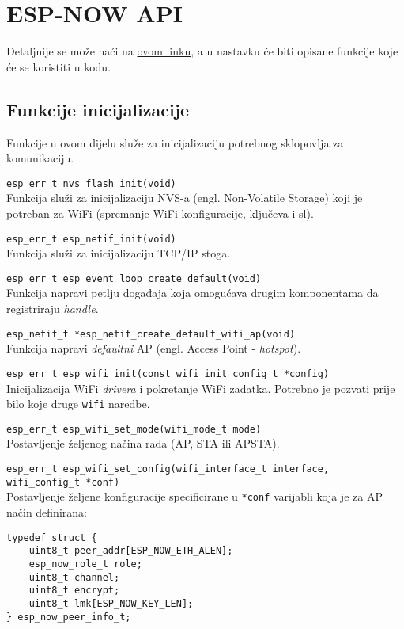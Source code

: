 \documentclass[seminarskirad]{fer}
\begin{document}
\section{ESP-NOW API}

Detaljnije se može naći na \hyperlink{https://docs.espressif.com/projects/esp-idf/en/v5.4/esp32/api-reference/}{ovom linku}, a u nastavku će biti opisane funkcije koje će se koristiti u kodu.

\subsection{Funkcije inicijalizacije}

Funkcije u ovom dijelu služe za inicijalizaciju potrebnog sklopovlja za komunikaciju.

\verb|esp_err_t nvs_flash_init(void)| \\
Funkcija služi za inicijalizaciju NVS-a (engl. Non-Volatile Storage) koji je potreban za WiFi (spremanje WiFi konfiguracije, ključeva i sl).

\verb|esp_err_t esp_netif_init(void)| \\
Funkcija služi za inicijalizaciju TCP/IP stoga.

\verb|esp_err_t esp_event_loop_create_default(void)| \\
Funkcija napravi petlju događaja koja omogućava drugim komponentama da registriraju \textit{handle}.

\verb|esp_netif_t *esp_netif_create_default_wifi_ap(void)| \\
Funkcija napravi \textit{defaultni} AP (engl. Access Point - \textit{hotspot}).

\verb|esp_err_t esp_wifi_init(const wifi_init_config_t *config)| \\
Inicijalizacija WiFi \textit{drivera} i pokretanje WiFi zadatka. Potrebno je pozvati prije bilo koje druge \verb|wifi| naredbe.

\verb|esp_err_t esp_wifi_set_mode(wifi_mode_t mode)| \\
Postavljenje željenog načina rada (AP, STA ili APSTA).

\verb|esp_err_t esp_wifi_set_config(wifi_interface_t interface, | \\
\verb|wifi_config_t *conf)| \\
Postavljenje željene konfiguracije specificirane u \verb|*conf| varijabli koja je za AP način definirana: 

\begin{verbatim}
typedef struct {
    uint8_t peer_addr[ESP_NOW_ETH_ALEN]; 
    esp_now_role_t role;               
    uint8_t channel;                      
    uint8_t encrypt;                      
    uint8_t lmk[ESP_NOW_KEY_LEN];         
} esp_now_peer_info_t;
\end{verbatim}
\end{document}
